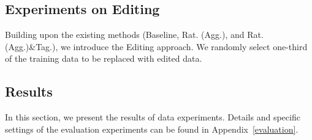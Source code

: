 \documentclass[11pt]{article}
\begin{document}


\subsection{Experiments on Editing}

Building upon the existing methods (Baseline, Rat. (Agg.), and Rat. (Agg.)\&Tag.), we introduce the Editing approach. We randomly select one-third of the training data to be replaced with edited data.
\vspace{2pt} 
\subsection{Results}

In this section, we present the results of data experiments. Details and specific settings of the evaluation experiments can be found in Appendix~\ref{evaluation}.
\end{document}
